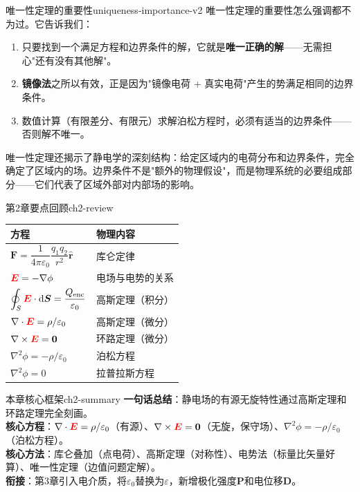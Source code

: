 \documentclass[11pt,a4paper,openany,oneside]{book}
\newcommand{\diff}{\mathrm{d}}
\newcommand{\vecE}{\textcolor{red}{\vect{E}}}
\newcommand{\eps}{\varepsilon}
\newcommand{\vect}[1]{\bm{#1}}
\newcommand{\unitvec}[1]{\hat{\vect{#1}}}
\newcommand{\grad}{\nabla}
\newcommand{\curl}{\nabla\times}
\newcommand{\divg}{\nabla\cdot}
\newcommand{\lap}{\nabla^2}
\begin{document}
\begin{insight}{唯一性定理的重要性}{uniqueness-importance-v2}
唯一性定理的重要性怎么强调都不为过。它告诉我们：
\begin{enumerate}
\item 只要找到一个满足方程和边界条件的解，它就是\textbf{唯一正确的解}——无需担心"还有没有其他解"。
\item \textbf{镜像法}之所以有效，正是因为"镜像电荷 + 真实电荷"产生的势满足相同的边界条件。
\item 数值计算（有限差分、有限元）求解泊松方程时，必须有适当的边界条件——否则解不唯一。
\end{enumerate}

唯一性定理还揭示了静电学的深刻结构：给定区域内的电荷分布和边界条件，完全确定了区域内的场。边界条件不是"额外的物理假设"，而是物理系统的必要组成部分——它们代表了区域外部对内部场的影响。
\end{insight}

\begin{review}{第2章要点回顾}{ch2-review}
\begin{center}
\begin{tabular}{@{}ll@{}}
\toprule
\textbf{方程} & \textbf{物理内容} \\
\midrule
$\vect{F} = \dfrac{1}{4\pi\eps_0}\dfrac{q_1 q_2}{r^2}\unitvec{r}$ & 库仑定律 \\
$\vecE = -\grad\phi$ & 电场与电势的关系 \\
$\displaystyle\oint_S \vecE\cdot\diff\vect{S} = \dfrac{Q_{\text{enc}}}{\eps_0}$ & 高斯定理（积分） \\
$\divg\vecE = \rho/\eps_0$ & 高斯定理（微分） \\
$\curl\vecE = \vect{0}$ & 环路定理（微分） \\
$\lap\phi = -\rho/\eps_0$ & 泊松方程 \\
$\lap\phi = 0$ & 拉普拉斯方程 \\
\bottomrule
\end{tabular}
\end{center}
\end{review}

\begin{tip}{本章核心框架}{ch2-summary}
\textbf{一句话总结}：静电场的有源无旋特性通过高斯定理和环路定理完全刻画。\\
\textbf{核心方程}：$\divg\vecE=\rho/\eps_0$（有源）、$\curl\vecE=\vect{0}$（无旋，保守场）、$\lap\phi=-\rho/\eps_0$（泊松方程）。\\
\textbf{核心方法}：库仑叠加（点电荷）、高斯定理（对称性）、电势法（标量比矢量好算）、唯一性定理（边值问题定解）。\\
\textbf{衔接}：第3章引入电介质，将$\eps_0$替换为$\eps$，新增极化强度$\vect{P}$和电位移$\vect{D}$。
\end{tip}
\end{document}
